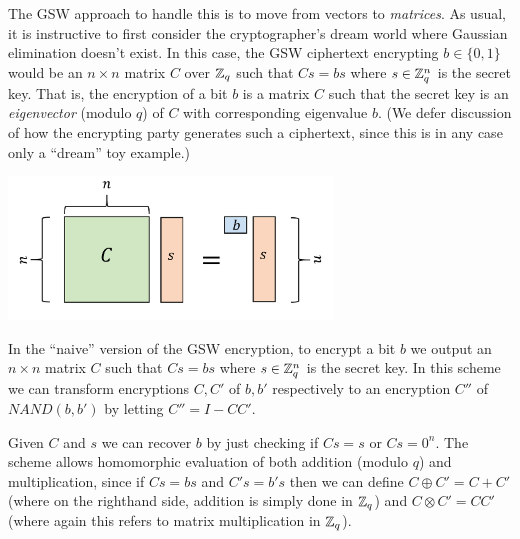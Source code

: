 The GSW approach to handle this is to move from vectors to
\emph{matrices}. As usual, it is instructive to first consider the
cryptographer's dream world where Gaussian elimination doesn't exist. In
this case, the GSW ciphertext encrypting \(b\in\{0,1\}\) would be an
\(n\times n\) matrix \(C\) over \({\mathbb{Z}}_q\) such that \(Cs = bs\) where
\(s\in{\mathbb{Z}}_q^n\) is the secret key. That is, the encryption of a bit \(b\)
is a matrix \(C\) such that the secret key is an \emph{eigenvector}
(modulo \(q\)) of \(C\) with corresponding eigenvalue \(b\). (We defer
discussion of how the encrypting party generates such a ciphertext,
since this is in any case only a ``dream'' toy example.)


\begin{marginfigure}
\centering
\includegraphics[width=\linewidth, height=1.5in, keepaspectratio]{../figure/naivegsw.png}
\caption{In the ``naive'' version of the GSW encryption, to encrypt a
bit \(b\) we output an \(n\times n\) matrix \(C\) such that \(Cs=bs\)
where \(s \in {\mathbb{Z}}_q^n\) is the secret key. In this scheme we can
transform encryptions \(C,C'\) of \(b,b'\) respectively to an encryption
\(C''\) of \(\ensuremath{\mathit{NAND}}(b,b')\) by letting
\(C'' = I-CC'\).}
\label{naivegswfig}
\end{marginfigure}

Given \(C\) and \(s\) we can recover \(b\) by just checking if \(Cs=s\)
or \(Cs=0^n\). The scheme allows homomorphic evaluation of both addition
(modulo \(q\)) and multiplication, since if \(Cs = bs\) and \(C's=b's\)
then we can define \(C \oplus C' = C + C'\) (where on the righthand
side, addition is simply done in \({\mathbb{Z}}_q\)) and
\(C\otimes C' = \ensuremath{\mathit{CC}}'\) (where again this refers to
matrix multiplication in \({\mathbb{Z}}_q\)).

